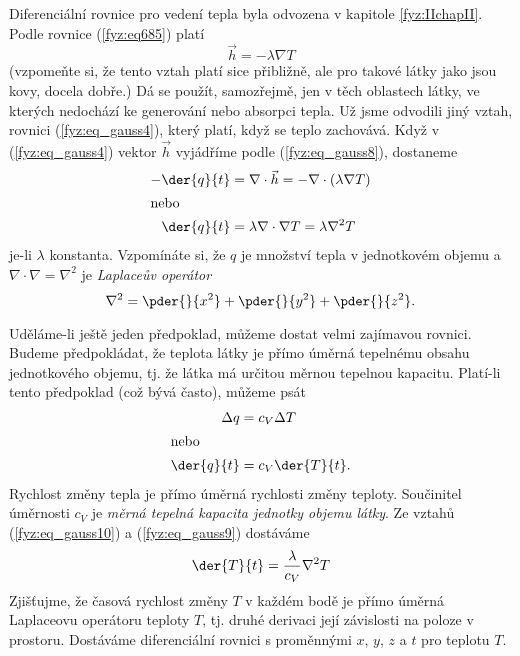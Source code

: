       Diferenciální rovnice pro vedení tepla byla odvozena v kapitole 
      \ref{fyz:IIchapII}. Podle rovnice (\ref{fyz:eq685}) platí
      \begin{equation}\label{fyz:eq_gauss8}
      \vec{h}=-\lambda\nabla T
      \end{equation}    
      (vzpomeňte si, že tento vztah platí sice přibližně, ale pro takové látky jako jsou kovy, 
      docela dobře.) Dá se použít, samozřejmě, jen v těch oblastech látky, ve kterých nedochází ke 
      generování nebo absorpci tepla. Už jsme odvodili jiný vztah, rovnici (\ref{fyz:eq_gauss4}), 
      který platí, když se teplo zachovává. Když v (\ref{fyz:eq_gauss4}) vektor \(\vec{h}\) 
      vyjádříme podle (\ref{fyz:eq_gauss8}), dostaneme
      \begin{align}
        - \der{q}{t} &= \nabla\cdot\vec{h} = - \nabla\cdot(\lambda\nabla T)     \nonumber    \\ 
        \intertext{nebo}
          \der{q}{t} &= \lambda\nabla\cdot\nabla T = \lambda\nabla^2 T     \label{fyz:eq_gauss9}
      \end{align}
      je-li \(\lambda\) konstanta. Vzpomínáte si, že \(q\) je množství tepla v jednotkovém objemu a
      \(\nabla\cdot\nabla = \nabla^2\) je \emph{Laplaceův operátor}
      \begin{equation*}
        \nabla^2= \pder{ }{x^2} + \pder{ }{y^2} + \pder{ }{z^2}.
      \end{equation*}       
    
      Uděláme-li ještě jeden předpoklad, můžeme dostat velmi zajímavou rovnici. Budeme 
      předpokládat, že teplota látky je přímo úměrná tepelnému obsahu jednotkového objemu, tj. že 
      látka má určitou  měrnou tepelnou kapacitu. Platí-li tento předpoklad (což bývá často), 
      můžeme psát
      \begin{align}
        \Delta q   &= c_V\Delta T                                        \nonumber    \\ 
        \intertext{nebo}
        \der{q}{t} &= c_V\der{T}{t}.                                     \label{fyz:eq_gauss10}
      \end{align}    
      Rychlost změny tepla je přímo úměrná rychlosti změny teploty. Součinitel úměrnosti \(c_V\) je 
      \emph{měrná tepelná kapacita jednotky objemu látky}. Ze vztahů (\ref{fyz:eq_gauss10}) a 
      (\ref{fyz:eq_gauss9}) 
      dostáváme
      \begin{equation}\label{fyz:eq_gauss11}
       \der{T}{t} = \frac{\lambda}{c_V}\nabla^2T
      \end{equation}
      Zjišťujme, že časová rychlost změny \(T\) v každém bodě je přímo úměrná Laplaceovu operátoru 
      teploty \(T\), tj. druhé derivaci její závislosti na poloze v prostoru. Dostáváme 
      diferenciální rovnici s proměnnými \(x\), \(y\), \(z\) a \(t\) pro teplotu \(T\).
      
